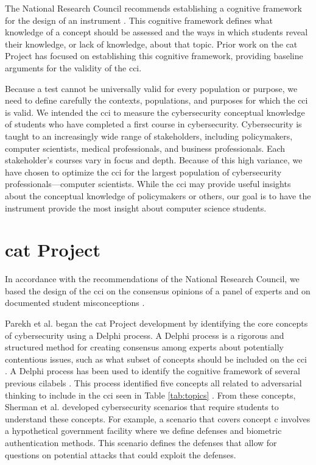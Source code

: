 The National Research Council recommends establishing a cognitive framework for the design of an instrument \cite{knowing_what_students_know}. This cognitive framework defines what knowledge of a concept should be assessed and the ways in which students reveal their knowledge, or lack of knowledge, about that topic. Prior work on the \gls{cat} Project has focused on establishing this cognitive framework, providing baseline arguments for the validity of the \gls{cci}.     
    
Because a test cannot be universally valid for every population or purpose, we need to define carefully the contexts, populations, and purposes for which the \gls{cci} is valid. We intended the \gls{cci} to measure the cybersecurity conceptual knowledge of students who have completed a first course in cybersecurity. Cybersecurity is taught to an increasingly wide range of stakeholders, including policymakers, computer scientists, medical professionals, and business professionals. Each stakeholder's courses vary in focus and depth. Because of this high variance, we have chosen to optimize the \gls{cci} for the largest population of cybersecurity professionals---computer scientists. While the \gls{cci} may provide useful insights about the conceptual knowledge of policymakers or others, our goal is to have the instrument provide the most insight about computer science students.   

\section{\gls{cat} Project}

In accordance with the recommendations of the National Research Council, we based the design of the \gls{cci} on the consensus opinions of a panel of experts and on documented student misconceptions \cite{jcerp, misconceptions, delphi}.

Parekh et al. \cite{delphi} began the \gls{cat} Project development by identifying the core concepts of cybersecurity using a Delphi process. A Delphi process is a rigorous and structured method for creating consensus among experts about potentially contentious issues, such as what subset of concepts should be included on the \gls{cci} \cite{original_delphi}. A Delphi process has been used to identify the cognitive framework of several previous \glspl{cilabel} \cite{dlci}. This process identified five concepts all related to adversarial thinking to include in the \gls{cci} seen in Table \ref{tab:topics} \cite{delphi}. From these concepts, Sherman et al. \cite{scenarios} developed cybersecurity scenarios that require students to understand these concepts. For example, a scenario that covers concept \gls{c} involves a hypothetical government facility where we define defenses and biometric authentication methods. This scenario defines the defenses that allow for questions on potential attacks that could exploit the defenses.     
     
